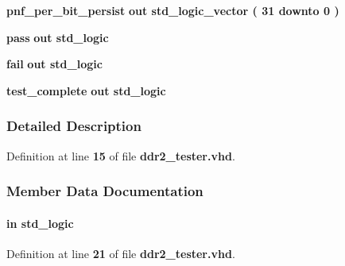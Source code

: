 \begin{DoxyCompactItemize}
\item 
{\bf pnf\+\_\+per\+\_\+bit\+\_\+persist}  {\bfseries {\bfseries \textcolor{keywordflow}{out}\textcolor{vhdlchar}{ }}} {\bfseries \textcolor{comment}{std\+\_\+logic\+\_\+vector}\textcolor{vhdlchar}{ }\textcolor{vhdlchar}{(}\textcolor{vhdlchar}{ }\textcolor{vhdlchar}{ } \textcolor{vhdldigit}{31} \textcolor{vhdlchar}{ }\textcolor{keywordflow}{downto}\textcolor{vhdlchar}{ }\textcolor{vhdlchar}{ } \textcolor{vhdldigit}{0} \textcolor{vhdlchar}{ }\textcolor{vhdlchar}{)}\textcolor{vhdlchar}{ }} 
\item 
{\bf pass}  {\bfseries {\bfseries \textcolor{keywordflow}{out}\textcolor{vhdlchar}{ }}} {\bfseries \textcolor{comment}{std\+\_\+logic}\textcolor{vhdlchar}{ }} 
\item 
{\bf fail}  {\bfseries {\bfseries \textcolor{keywordflow}{out}\textcolor{vhdlchar}{ }}} {\bfseries \textcolor{comment}{std\+\_\+logic}\textcolor{vhdlchar}{ }} 
\item 
{\bf test\+\_\+complete}  {\bfseries {\bfseries \textcolor{keywordflow}{out}\textcolor{vhdlchar}{ }}} {\bfseries \textcolor{comment}{std\+\_\+logic}\textcolor{vhdlchar}{ }} 
\end{DoxyCompactItemize}


\subsubsection{Detailed Description}


Definition at line {\bf 15} of file {\bf ddr2\+\_\+tester.\+vhd}.



\subsubsection{Member Data Documentation}
\paragraph[{begin\+\_\+test}]{ {\bfseries \textcolor{keywordflow}{in}\textcolor{vhdlchar}{ }} {\bfseries \textcolor{comment}{std\+\_\+logic}\textcolor{vhdlchar}{ }} \hspace{0.3cm}{\ttfamily [Port]}}\label{classddr2__tester_a9762949045cae07c0a98ab427ba77ccb}


Definition at line {\bf 21} of file {\bf ddr2\+\_\+tester.\+vhd}.

